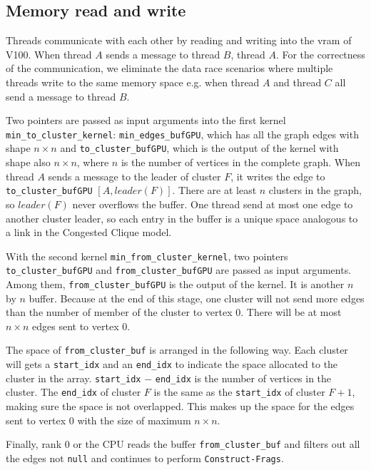\documentclass[english, 12pt, a4paper, elec, utf8, a-2b, online]{aaltothesis}
\begin{document}
\subsection{Memory read and write}
Threads communicate with each other by reading and writing into the vram of V100. When thread $A$ sends a message to thread $B$, thread $A$. For the correctness of the communication, we eliminate the data race scenarios where multiple threads write to the same memory space e.g. when thread $A$ and thread $C$ all send a message to thread $B$.

Two pointers are passed as input arguments into the first kernel \texttt{min\_to\_cluster\_kernel}: \texttt{min\_edges\_bufGPU}, which has all the graph edges with shape $n \times n$ and \texttt{to\_cluster\_bufGPU}, which is the output of the kernel with shape also $n \times n$, where $n$ is the number of vertices in the complete graph. When thread $A$ sends a message to the leader of cluster $F$, it writes the edge to \texttt{to\_cluster\_bufGPU} $[A, leader(F)]$. There are at least $n$ clusters in the graph, so $leader(F)$ never overflows the buffer. One thread send at most one edge to another cluster leader, so each entry in the buffer is a unique space analogous to a link in the Congested Clique model.

With the second kernel \texttt{min\_from\_cluster\_kernel}, two pointers \texttt{to\_cluster\_bufGPU} and \texttt{from\_cluster\_bufGPU} are passed as input arguments. Among them, \texttt{from\_cluster\_bufGPU} is the output of the kernel. It is another $n$ by $n$ buffer. Because at the end of this stage, one cluster will not send more edges than the number of member of the cluster to vertex $0$. There will be at most $n \times n$ edges sent to vertex $0$.

The space of \texttt{from\_cluster\_buf} is arranged in the following way. Each cluster will gets a \texttt{start\_idx} and an \texttt{end\_idx} to indicate the space allocated to the cluster in the array. \texttt{start\_idx} $-$ \texttt{end\_idx} is the number of vertices in the cluster. The \texttt{end\_idx} of cluster $F$ is the same as the \texttt{start\_idx} of cluster $F+1$, making sure the space is not overlapped. This makes up the space for the edges sent to vertex $0$ with the size of maximum $n \times n$.

Finally, rank $0$ or the CPU reads the buffer \texttt{from\_cluster\_buf} and filters out all the edges not \texttt{null} and continues to perform \texttt{Construct-Frags}.
\end{document}
